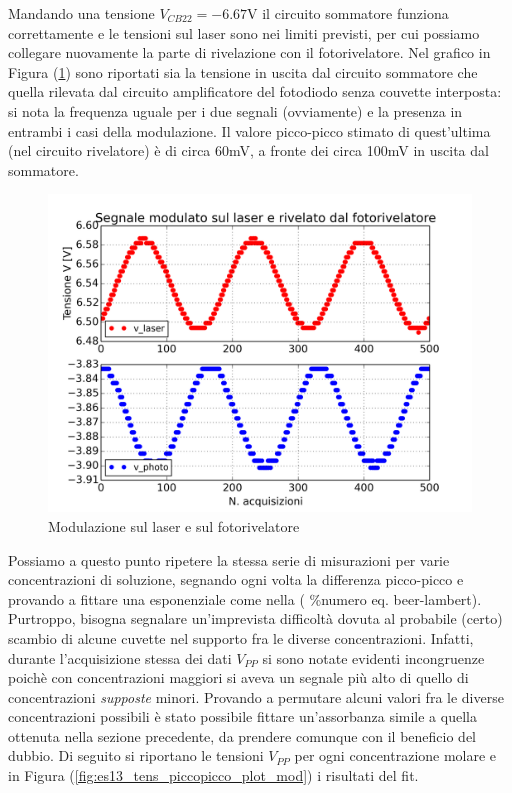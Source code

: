\documentclass[10pt,letterpaper]{article}
\begin{document}
Mandando una tensione $V_{CB22} = -6.67$V il circuito sommatore funziona correttamente e le tensioni sul laser sono nei limiti previsti, per cui possiamo collegare nuovamente la parte di rivelazione con il fotorivelatore. Nel grafico in Figura (\ref{fig:es11_plot}) sono riportati sia la tensione in uscita dal circuito sommatore che quella rilevata dal circuito amplificatore del fotodiodo senza couvette interposta: si nota la frequenza uguale per i due segnali (ovviamente) e la presenza in entrambi i casi della modulazione. Il valore picco-picco stimato di quest'ultima (nel circuito rivelatore) è di circa 60mV, a fronte dei circa 100mV in uscita dal sommatore.\\

\begin{figure}
\centering
\includegraphics[width=0.8\linewidth]{./es11_plot}
\caption{Modulazione sul laser e sul fotorivelatore}
\label{fig:es11_plot}
\end{figure}


Possiamo a questo punto ripetere la stessa serie di misurazioni per varie concentrazioni di soluzione, segnando ogni volta la differenza picco-picco e provando a fittare una esponenziale come nella ( \%numero eq. beer-lambert). Purtroppo, bisogna segnalare un'imprevista difficoltà dovuta al probabile (certo) scambio di alcune cuvette nel supporto fra le diverse concentrazioni. Infatti, durante l'acquisizione stessa dei dati $V_{PP}$ si sono notate evidenti incongruenze poichè con concentrazioni maggiori si aveva un segnale più alto di quello di concentrazioni \textit{supposte} minori. Provando a permutare alcuni valori fra le diverse concentrazioni possibili è stato possibile fittare un'assorbanza simile a quella ottenuta nella sezione precedente, da prendere comunque con il beneficio del dubbio. Di seguito si riportano le tensioni $V_{PP}$ per ogni concentrazione molare e in Figura (\ref{fig:es13_tens_piccopicco_plot_mod}) i risultati del fit.\\
\end{document}
